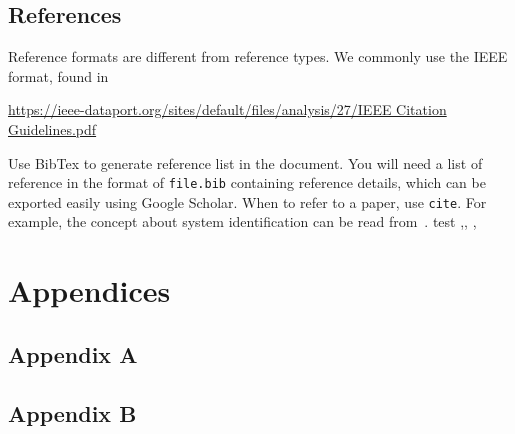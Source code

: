 \documentclass[11pt,a4paper]{article}
\begin{document}
\subsection{References}
Reference formats are different from reference types. We commonly use the IEEE format, found in 

\url{https://ieee-dataport.org/sites/default/files/analysis/27/IEEE Citation Guidelines.pdf}

Use BibTex to generate reference list in the document. You will need a list of reference in the format of \texttt{file.bib} containing reference details, which can be exported easily using Google Scholar. When to refer to a paper, use \texttt{cite}. For example, the concept about system identification can be read from~\cite{SoS:89}. test \cite{CPM:89},\citep{CaA:15}, \cite{GrB:08b},\citep{JiY:09}




\section{Appendices}

\subsection{Appendix A}

\subsection{Appendix B}
\end{document}
